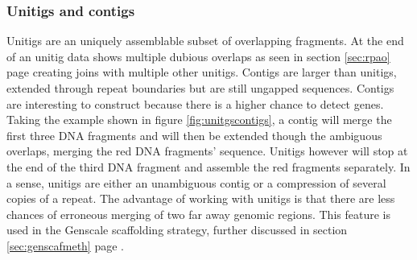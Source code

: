 \documentclass[12pt]{article}
\newcommand*{\fulleref}[1]{section \hyperref[{#1}] {\ref*{#1}} page {\pageref{#1}}}%
\begin{document}
\subsubsection{Unitigs and contigs} \label{sec:conuni}
Unitigs are an uniquely assemblable subset of overlapping fragments. At the end of an unitig data shows multiple dubious overlaps as seen in \fulleref{sec:rpao} creating joins with multiple other unitigs. Contigs are larger than unitigs, extended through repeat boundaries but are still ungapped sequences. Contigs are interesting to construct because there is a higher chance to detect genes. 
Taking the example shown in figure \ref{fig:unitgscontigs}, a contig will merge the first three DNA fragments and will then be extended though the ambiguous overlaps, merging the red DNA fragments' sequence. Unitigs however will stop at the end of the third DNA fragment and assemble the red fragments separately. In a sense, unitigs are either an unambiguous contig or a compression of several copies of a repeat. The advantage of working with unitigs is that there are less chances of erroneous merging of two far away genomic regions. This feature is used in the Genscale scaffolding strategy, further discussed in \fulleref{sec:genscafmeth}.
\end{document}
